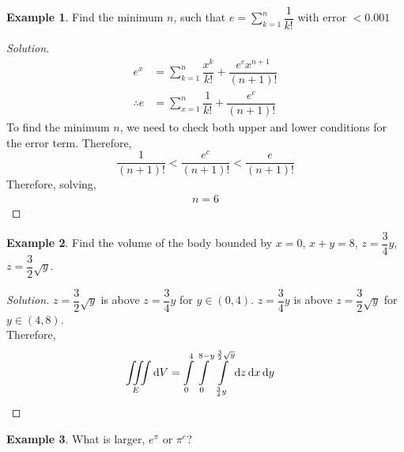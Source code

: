 \documentclass[fleqn, a4paper, 12pt]{article}
\theoremstyle{definition}
\newtheorem{example}{Example}
\theoremstyle{theorem}
\theoremstyle{remark}
\newenvironment{solution}
{\begin{proof}[Solution]\let\qed\relax}
	{\end{proof}}
\begin{document}
\begin{example}
	Find the minimum $n$, such that $e = \sum_{k = 1}^{n} \dfrac{1}{k!}$ with error $< 0.001$
\end{example}

\begin{solution}
	\begin{align*}
		e^x &= \sum_{k = 1}^{n} \dfrac{x^k}{k!} + \dfrac{e^c x^{n+1}}{(n+1)!}\\
		\therefore e &= \sum_{x = 1}^{n} \dfrac{1}{k!} + \dfrac{e^c}{(n + 1)!}
	\end{align*}
	To find the minimum $n$, we need to check both upper and lower conditions for the error term. Therefore,
	\begin{equation*}
		\dfrac{1}{(n+1)!} < \dfrac{e^c}{(n+1)!} < \dfrac{e}{(n+1)!}
	\end{equation*}
	Therefore, solving,
	\begin{align*}
		n = 6
	\end{align*}
\end{solution}

\begin{example}
	Find the volume of the body bounded by $x = 0$, $x + y = 8$, $z = \dfrac{3}{4} y$, $z = \dfrac{3}{2} \sqrt{y}$.
\end{example}

\begin{solution}
	$z = \dfrac{3}{2} \sqrt{y}$ is above $z = \dfrac{3}{4} y$ for $y \in (0, 4)$. $z = \dfrac{3}{4} y$ is above $z = \dfrac{3}{2} \sqrt{y}$  for $y \in (4, 8)$.\\
	Therefore,
	\begin{align*}
		\iiint\limits_{E} \dif V &= \int\limits_{0}^{4} \int\limits_{0}^{8 - y} \int\limits_{\frac{3}{4} y}^{\frac{3}{2} \sqrt{y}} \dif z \dif x \dif y
	\end{align*}
\end{solution}

\begin{example}
	What is larger, $e^{\pi}$ or $\pi^e$?
\end{example}
\end{document}
